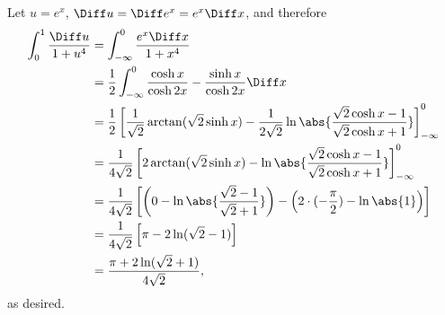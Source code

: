 \begin{enumerate}
          Let \(u = e^x\), \(\Diff u = \Diff e^x = e^x \Diff x\), and therefore
          \begin{align*}
              \int_{0}^{1} \frac{\Diff u}{1 + u^4} & = \int_{-\infty}^{0} \frac{e^x \Diff x}{1 + x^4}                                                                                                                     \\
                                                   & = \frac{1}{2} \int_{-\infty}^{0} \frac{\cosh x}{\cosh 2x} - \frac{\sinh x}{\cosh 2x} \Diff x                                                                         \\
                                                   & = \frac{1}{2} \left[\frac{1}{\sqrt{2}} \arctan(\sqrt{2} \sinh x) - \frac{1}{2\sqrt{2}} \ln\abs{\frac{\sqrt{2}\cosh x - 1}{\sqrt{2}\cosh x + 1}}\right]_{-\infty}^{0} \\
                                                   & = \frac{1}{4\sqrt{2}} \left[2\arctan(\sqrt{2} \sinh x) - \ln\abs{\frac{\sqrt{2}\cosh x - 1}{\sqrt{2}\cosh x + 1}}\right]_{-\infty}^{0}                               \\
                                                   & = \frac{1}{4\sqrt{2}} \left[\left(0 - \ln \abs{\frac{\sqrt{2} - 1}{\sqrt{2} + 1}}\right) - \left(2 \cdot (-\frac{\pi}{2}) - \ln\abs{1}\right)\right]                 \\
                                                   & = \frac{1}{4\sqrt{2}} \left[\pi - 2\ln(\sqrt{2} - 1)\right]                                                                                                          \\
                                                   & = \frac{\pi + 2\ln(\sqrt{2} + 1)}{4\sqrt{2}},
          \end{align*}
          as desired.
\end{enumerate}